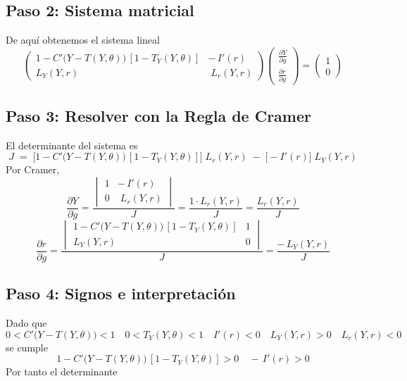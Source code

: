 \documentclass{article}
\begin{document}
\subsection*{Paso 2: Sistema matricial}
De aquí obtenemos el sistema lineal
\[
\begin{pmatrix}
1 - C'\bigl(Y - T(Y,\theta)\bigr)\,[1 - T_Y(Y,\theta)] & -\,I'(r) \\[6pt]
L_Y(Y,r)                                              & \;L_r(Y,r)
\end{pmatrix}
\begin{pmatrix}
\displaystyle \frac{\partial Y}{\partial g} \\[4pt]
\displaystyle \frac{\partial r}{\partial g}
\end{pmatrix}
=
\begin{pmatrix}
1 \\[4pt]
0
\end{pmatrix}
\]

\subsection*{Paso 3: Resolver con la Regla de Cramer}

El determinante del sistema es
\[
J \;=\;
\bigl[1 - C'\bigl(Y - T(Y,\theta)\bigr)\,[1 - T_Y(Y,\theta)]\bigr]\;L_r(Y,r)
\;-\;\bigl[-I'(r)\bigr]\;L_Y(Y,r)
\]
Por Cramer,
\[
\frac{\partial Y}{\partial g}
= \frac{
\begin{vmatrix}
1 & -\,I'(r) \\[4pt]
0 & \;L_r(Y,r)
\end{vmatrix}
}{J}
= \frac{1\cdot L_r(Y,r)}{J}
= \frac{L_r(Y,r)}{J}
\]
\[
\frac{\partial r}{\partial g}
= \frac{
\begin{vmatrix}
1 - C'\bigl(Y - T(Y,\theta)\bigr)\,[1 - T_Y(Y,\theta)] & 1 \\[4pt]
L_Y(Y,r)                                              & 0
\end{vmatrix}
}{J}
= \frac{-\,L_Y(Y,r)}{J}
\]

\subsection*{Paso 4: Signos e interpretación}

Dado que
\[
0 < C'\bigl(Y - T(Y,\theta)\bigr) < 1
\quad
0 < T_Y(Y,\theta) < 1
\quad
I'(r) < 0
\quad
L_Y(Y,r) > 0
\quad
L_r(Y,r) < 0
\]
se cumple
\[
1 - C'\bigl(Y - T(Y,\theta)\bigr)\,[1 - T_Y(Y,\theta)] > 0
\quad
-\,I'(r) > 0
\]
Por tanto el determinante
\end{document}
